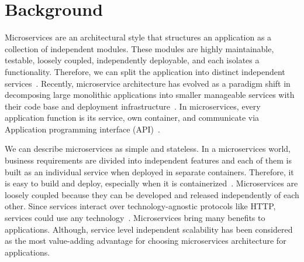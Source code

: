 
\section{Background}\label{sec:background}

\par Microservices are an architectural style that structures an application as a collection of independent modules. These modules are highly maintainable, testable, loosely coupled, independently deployable, and each isolates a functionality. Therefore, we can split the application into distinct independent services~\cite{thones2015}. Recently, microservice architecture has evolved as a paradigm shift in decomposing large monolithic applications into smaller manageable services with their code base and deployment infrastructure~\cite{Taibi2019}. In microservices, every application function is its service, own container, and communicate via Application programming interface (API)~\cite{Danbettinger2019}.

\par We can describe microservices as simple and stateless. In a microservices world, business requirements are divided into independent features and each of them is built as an individual service when deployed in separate containers. Therefore, it is easy to build and deploy, especially when it is containerized~\cite{Pavlovic2020, Zaytev2018}. Microservices are loosely coupled because they can be developed and released independently of each other. Since services interact over technology-agnostic protocols like HTTP, services could use any technology~\cite{Jaleel2017}. Microservices bring many benefits to applications. Although, service level independent scalability has been considered as the most value-adding advantage for choosing microservices architecture for applications.

